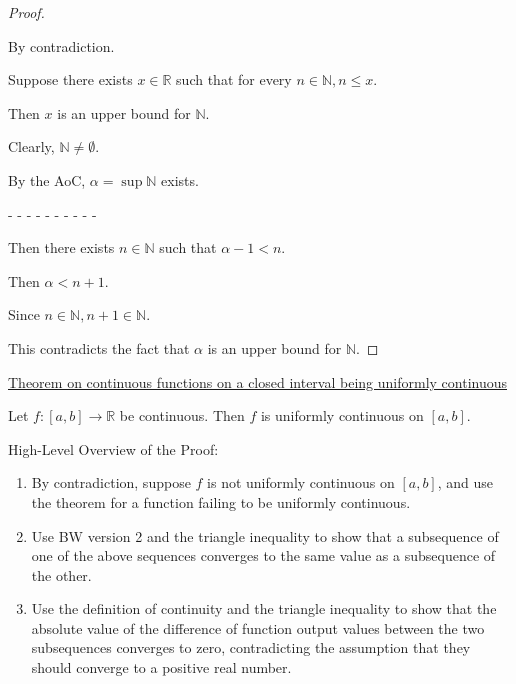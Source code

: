 \documentclass[12pt]{article}
\newcommand{\RR}{\mathbb{R}} %
\newcommand{\NN}{\mathbb{N}}
\begin{document}
\begin{proof}
$ $

By contradiction.

Suppose there exists $x \in \RR$ such that for every $n \in \NN, n \le x$.

Then $x$ is an upper bound for $\NN$.

Clearly, $\NN \ne \emptyset$.

By the AoC, $\alpha = \sup \NN$ exists.

- - - - - - - - - -

Then there exists $n \in \NN$ such that $\alpha - 1 < n$.

Then $\alpha < n + 1$.

Since $n \in \NN, n + 1 \in \NN$.

This contradicts the fact that $\alpha$ is an upper bound for $\NN$.
\end{proof}

\pagebreak

\underline{Theorem on continuous functions on a closed interval being uniformly continuous}

Let $f : [a, b] \rightarrow \RR$ be continuous. Then $f$ is uniformly continuous on $[a, b]$.

\dotfill

High-Level Overview of the Proof:

\begin{enumerate}
\item By contradiction, suppose $f$ is not uniformly continuous on $[a, b]$, and use the theorem for a function failing to be uniformly continuous.

\item Use BW version 2 and the triangle inequality to show that a subsequence of one of the above sequences converges to the same value as a subsequence of the other.

\item Use the definition of continuity and the triangle inequality to show that the absolute value of the difference of function output values between the two subsequences converges to zero, contradicting the assumption that they should converge to a positive real number.
\end{enumerate}

\dotfill
\end{document}

